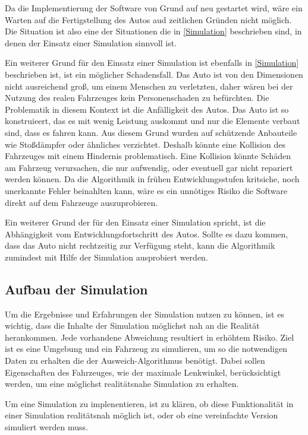 Da die Implementierung der Software von Grund auf neu gestartet wird, wäre ein Warten auf die Fertigstellung des Autos aud zeitlichen Gründen nicht möglich.
Die Situation ist also eine der Situationen die in \ref{Simulation} beschrieben sind, in denen der Einsatz einer Simulation sinnvoll ist.

Ein weiterer Grund für den Einsatz einer Simulation ist ebenfalls in \ref{Simulation} beschrieben ist, 
ist ein möglicher Schadensfall. Das Auto ist von den Dimensionen nicht ausreichend groß, 
um einem Menschen zu verletzten, daher wären bei der Nutzung des realen Fahrzeuges kein Personenschaden zu befürchten.
Die Problematik in diesem Kontext ist die Anfälligkeit des Autos. 
Das Auto ist so konstruieert, das es mit wenig Leistung auskommt und nur die Elemente verbaut sind, dass es fahren kann. 
Aus diesem Grund wurden auf schützende Anbauteile wie Stoßdämpfer oder ähnliches verzichtet.
Deshalb könnte eine Kollision des Fahrzeuges mit einem Hindernis problematisch. 
Eine Kollision könnte Schäden am Fahrzeug verursachen, die nur aufwendig, oder eventuell gar nicht repariert werden können.
Da die Algorithmik in frühen Entwicklungsstufen kritsiche, noch unerkannte Fehler beinahlten kann,
wäre es ein unnötiges Risiko die Software direkt auf dem Fahrzeuge auszuprobieren.

Ein weiterer Grund der für den Einsatz einer Simulation spricht, ist die Abhängigkeit vom Entwicklungsfortschritt des Autos. 
Sollte es dazu kommen, dass das Auto nicht rechtzeitig zur Verfügung steht, 
kann die Algorithmik zumindest mit Hilfe der Simulation ausprobiert werden.

\subsection{Aufbau der Simulation}
Um die Ergebnisse und Erfahrungen der Simulation nutzen zu können, ist es wichtig, dass die Inhalte der Simulation möglichst nah an die Realität herankommen.
Jede vorhandene Abweichung resultiert in erhöhtem Risiko. 
Ziel ist es eine Umgebung und ein Fahrzeug zu simulieren, um so die notwendigen Daten zu erhalten die der Ausweich-Algorithmus benötigt.
Dabei sollen Eigenschaften des Fahrzeuges, wie der maximale Lenkwinkel, berücksichtigt werden, um eine möglichst realitätsnahe Simulation zu erhalten.   

Um eine Simulation zu implenentieren, ist zu klären, ob diese Funktionalität in einer Simulation realitätsnah möglich ist, oder ob eine vereinfachte Version simuliert werden muss.

